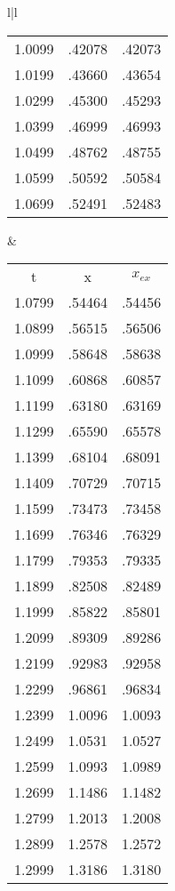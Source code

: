 \begin{figure}
\begin{tabular}{l|l}
\begin{tabular}{ccc}
            1.0099 & .42078 & .42073 \\
            1.0199 & .43660 & .43654 \\
            1.0299 & .45300 & .45293 \\
            1.0399 & .46999 & .46993 \\
            1.0499 & .48762 & .48755 \\
            1.0599 & .50592 & .50584 \\
            1.0699 & .52491 & .52483 \\
        \end{tabular}
        &
        \begin{tabular}{ccc}
            t &  x  & $x_{ex}$ \\
            1.0799 & .54464 & .54456 \\
            1.0899 & .56515 & .56506 \\
            1.0999 & .58648 & .58638 \\
            1.1099 & .60868 & .60857 \\
            1.1199 & .63180 & .63169 \\
            1.1299 & .65590 & .65578 \\
            1.1399 & .68104 & .68091 \\
            1.1409 & .70729 & .70715 \\
            1.1599 & .73473 & .73458 \\
            1.1699 & .76346 & .76329 \\
            1.1799 & .79353 & .79335 \\
            1.1899 & .82508 & .82489 \\
            1.1999 & .85822 & .85801 \\
            1.2099 & .89309 & .89286 \\
            1.2199 & .92983 & .92958 \\
            1.2299 & .96861 & .96834 \\
            1.2399 & 1.0096 & 1.0093 \\
            1.2499 & 1.0531 & 1.0527 \\
            1.2599 & 1.0993 & 1.0989 \\
            1.2699 & 1.1486 & 1.1482 \\
            1.2799 & 1.2013 & 1.2008 \\
            1.2899 & 1.2578 & 1.2572 \\
            1.2999 & 1.3186 & 1.3180 \\

\end{tabular}
\end{tabular}
\end{figure}
